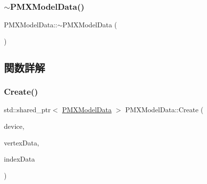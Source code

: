 \mbox{\label{class_p_m_x_model_data_aab20c1e8dd3219cd165f877508e256a6}} 
\subsubsection{\texorpdfstring{$\sim$\+P\+M\+X\+Model\+Data()}{~PMXModelData()}}
{\footnotesize\ttfamily P\+M\+X\+Model\+Data\+::$\sim$\+P\+M\+X\+Model\+Data (\begin{DoxyParamCaption}{ }\end{DoxyParamCaption})}



\subsection{関数詳解}
\mbox{\label{class_p_m_x_model_data_a86aa963671719340a27fc76f88268dac}} 
\subsubsection{\texorpdfstring{Create()}{Create()}\hspace{0.1cm}{\footnotesize\ttfamily [1/2]}}
{\footnotesize\ttfamily std\+::shared\+\_\+ptr$<$ \mbox{\hyperlink{class_p_m_x_model_data}{P\+M\+X\+Model\+Data}} $>$ P\+M\+X\+Model\+Data\+::\+Create (\begin{DoxyParamCaption}\item[{std\+::shared\+\_\+ptr$<$ \mbox{\hyperlink{class_device}{Device}} $>$}]{device,  }\item[{std\+::vector$<$ \mbox{\hyperlink{struct_p_m_x_1_1_vertex}{P\+M\+X\+::\+Vertex}} $>$}]{vertex\+Data,  }\item[{std\+::vector$<$ \mbox{\hyperlink{struct_p_m_x_1_1_index}{P\+M\+X\+::\+Index}} $>$}]{index\+Data }\end{DoxyParamCaption})\hspace{0.3cm}{\ttfamily [static]}}

\mbox{\label{class_p_m_x_model_data_ad65a359bdb1bd0e82225bee2c4158036}} 
